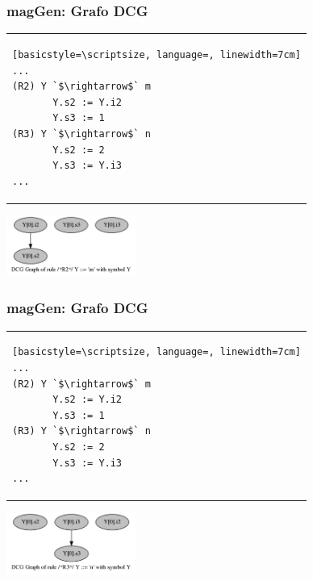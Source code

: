 \documentclass[10pt, xcolor=table, xcolor=dvipsnames]{beamer}
\newcommand{\maggen}{\textbf{magGen}}
\begin{document}
\begin{frame}[fragile]
    \frametitle{\maggen: Grafo DCG}
\begin{center}        
\begin{tabular}{p{6cm}}
\begin{lstlisting}[basicstyle=\scriptsize, language=, linewidth=7cm]
...
(R2) Y `$\rightarrow$` m
       Y.s2 := Y.i2
       Y.s3 := 1
(R3) Y `$\rightarrow$` n
       Y.s2 := 2
       Y.s3 := Y.i3
...
\end{lstlisting}
\end{tabular}
\end{center}
\begin{center}\includegraphics[width=160px, height=76px]{./11_dcg_graph.png}\end{center}
\end{frame}

\begin{frame}[fragile]
    \frametitle{\maggen: Grafo DCG}
\begin{center}        
\begin{tabular}{p{6cm}}
\begin{lstlisting}[basicstyle=\scriptsize, language=, linewidth=7cm]
...
(R2) Y `$\rightarrow$` m
       Y.s2 := Y.i2
       Y.s3 := 1
(R3) Y `$\rightarrow$` n
       Y.s2 := 2
       Y.s3 := Y.i3
...
\end{lstlisting}
\end{tabular}
\end{center}
\begin{center}\includegraphics[width=160px, height=77px]{./12_dcg_graph.png}\end{center}
\end{frame}
\end{document}
